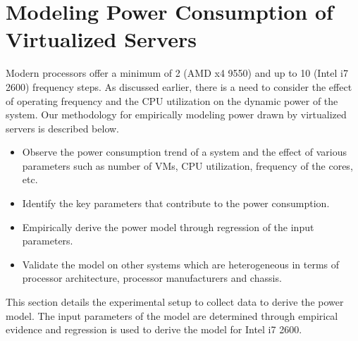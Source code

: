 \documentclass{sig-alternate}
\begin{document}
\section{Modeling Power Consumption of Virtualized Servers}
\label{sec:WModel}
Modern processors offer a minimum of 2 (AMD x4 9550) and up to 10 (Intel i7 2600) frequency steps. As discussed earlier, there is a need to consider the effect of operating frequency and the CPU utilization on the dynamic power of the system. Our methodology for empirically modeling power drawn by virtualized servers is described below.
\begin{itemize}
 \item Observe the power consumption trend of a system and the effect of various parameters such as number of VMs, CPU utilization, frequency of the cores, etc.
 \item Identify the key parameters that contribute to the power consumption.
 \item Empirically derive the power model through regression of the input parameters.
 \item Validate the model on other systems which are heterogeneous in terms of processor architecture, processor manufacturers and chassis. 
\end{itemize}
This section details the experimental setup to collect data to derive the power model. The input parameters of the model are determined through empirical evidence and regression is used to derive the model for Intel i7 2600. 
\end{document}

